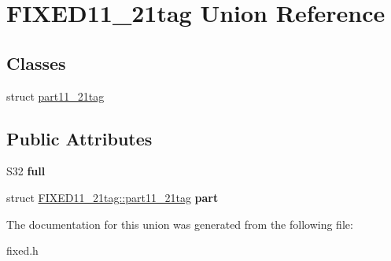 \hypertarget{union_f_i_x_e_d11__21tag}{
\section{FIXED11\_\-21tag Union Reference}
\label{union_f_i_x_e_d11__21tag}
}
\subsection*{Classes}
\begin{DoxyCompactItemize}
\item 
struct \hyperlink{struct_f_i_x_e_d11__21tag_1_1part11__21tag}{part11\_\-21tag}
\end{DoxyCompactItemize}
\subsection*{Public Attributes}
\begin{DoxyCompactItemize}
\item 
\hypertarget{union_f_i_x_e_d11__21tag_a4006ee87671df0d44ee614806340a8eb}{
S32 {\bfseries full}}
\label{union_f_i_x_e_d11__21tag_a4006ee87671df0d44ee614806340a8eb}

\item 
\hypertarget{union_f_i_x_e_d11__21tag_a1ffc7638049325fd61dd0738b70cab0f}{
struct \hyperlink{struct_f_i_x_e_d11__21tag_1_1part11__21tag}{FIXED11\_\-21tag::part11\_\-21tag} {\bfseries part}}
\label{union_f_i_x_e_d11__21tag_a1ffc7638049325fd61dd0738b70cab0f}

\end{DoxyCompactItemize}


The documentation for this union was generated from the following file:\begin{DoxyCompactItemize}
\item 
fixed.h\end{DoxyCompactItemize}
